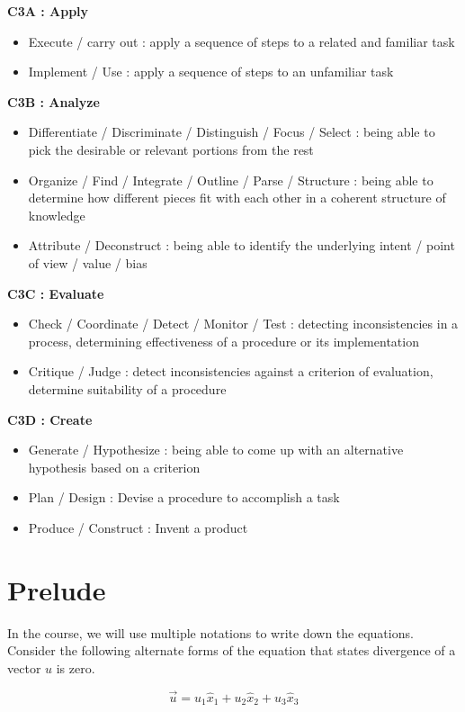 {\bf C3A : Apply} 
\begin{itemize}
\item Execute / carry out : apply a sequence of steps to a related and familiar task
\item Implement / Use : apply a sequence of steps to an unfamiliar task
\end{itemize} 

{\bf C3B : Analyze} 
\begin{itemize}
\item Differentiate / Discriminate / Distinguish / Focus / Select : being able to pick the desirable or relevant portions from the rest
\item Organize / Find / Integrate / Outline / Parse / Structure : being able to determine how different pieces fit with each other in a coherent structure of knowledge
\item Attribute / Deconstruct : being able to identify the underlying intent / point of view / value / bias
\end{itemize}

{\bf C3C : Evaluate} 
\begin{itemize}
\item Check / Coordinate / Detect / Monitor / Test : detecting inconsistencies in a process, determining effectiveness of a procedure or its implementation
\item Critique / Judge : detect inconsistencies against a criterion of evaluation, determine suitability of a procedure
\end{itemize}

{\bf C3D : Create} 
\begin{itemize}
\item Generate / Hypothesize : being able to come up with an alternative hypothesis based on a criterion
\item Plan / Design : Devise a procedure to accomplish a task
\item Produce / Construct : Invent a product
\end{itemize}

\section{Prelude}

In the course, we will use multiple notations to write down the equations. Consider the following alternate forms of the equation that states divergence of a vector $u$ is zero.

$$\vec{u} = u_1 \hat{x}_1 + u_2 \hat{x}_2 + u_3 \hat{x}_3 $$

